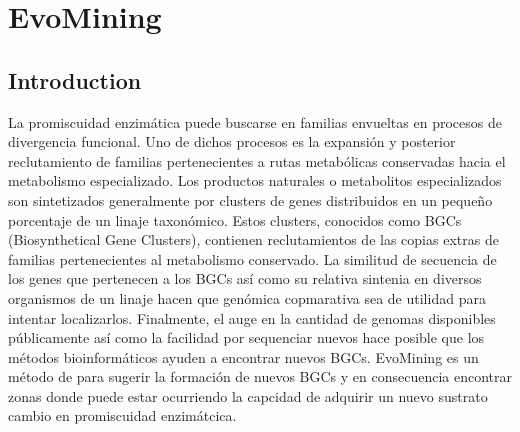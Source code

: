 \documentclass[12pt,twoside]{reedthesis}
\begin{document}
  \begin{Shaded}
  \begin{Highlighting}[]
  \NormalTok{####################################################}
  \NormalTok{####}
  
  
  \StringTok{ } \NormalTok{(}\NormalTok{),} \NormalTok{(}\NormalTok{),}\OperatorTok{+}\OperatorTok{-}
  \OperatorTok{$}
  
  \NormalTok{####################################################################}
  \end{Highlighting}
  \end{Shaded}
  
  \chapter{EvoMining}\label{rmd-basics}
  
  \section{Introduction}\label{introduction}
  
  La promiscuidad enzimática puede buscarse en familias envueltas en
  procesos de divergencia funcional. Uno de dichos procesos es la
  expansión y posterior reclutamiento de familias pertenecientes a rutas
  metabólicas conservadas hacia el metabolismo especializado. Los
  productos naturales o metabolitos especializados son sintetizados
  generalmente por clusters de genes distribuidos en un pequeño porcentaje
  de un linaje taxonómico. Estos clusters, conocidos como BGCs
  (Biosynthetical Gene Clusters), contienen reclutamientos de las copias
  extras de familias pertenecientes al metabolismo conservado. La
  similitud de secuencia de los genes que pertenecen a los BGCs así como
  su relativa sintenia en diversos organismos de un linaje hacen que
  genómica copmarativa sea de utilidad para intentar localizarlos.
  Finalmente, el auge en la cantidad de genomas disponibles públicamente
  así como la facilidad por sequenciar nuevos hace posible que los métodos
  bioinformáticos ayuden a encontrar nuevos BGCs. EvoMining es un método
  de para sugerir la formación de nuevos BGCs y en consecuencia encontrar
  zonas donde puede estar ocurriendo la capcidad de adquirir un nuevo
  sustrato cambio en promiscuidad enzimátcica.
  
\end{document}
